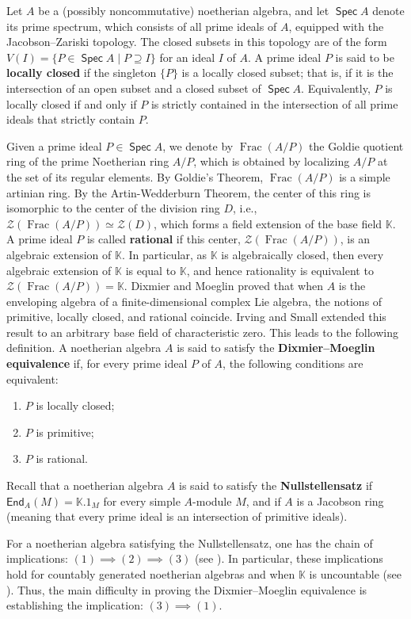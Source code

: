 \documentclass[11pt]{article}
\theoremstyle{definition}
\numberwithin{equation}{section}
\newcommand{\KK}{\mathbb{K}}
\newcommand{\cZ}{\mathcal{Z}}
\newcommand\End{\mathsf{End}}
\DeclareMathOperator{\gfrac}{\mathrm{Frac}}
\DeclareMathOperator{\spec}{\mathsf{Spec}}
\begin{document}
Let $A$ be a (possibly noncommutative) noetherian algebra, and let $\spec A$ denote its prime spectrum, which consists of all prime ideals of $A$,  equipped with the Jacobson--Zariski topology. The closed subsets in this topology are of the form  $V(I) = \{ P \in \spec A \mid P \supseteq I \}$ for an ideal $I$  of $A$. A prime ideal $P$ is said to be \textbf{locally closed} if the singleton $\{P\}$ is a locally closed subset;  that is, if it is the intersection of an open subset and a closed subset of $\spec A$. 
  Equivalently, $P$ is locally closed if and only if $P$ is strictly contained in the intersection of all prime ideals that strictly contain $P$.
  
Given a prime ideal $P \in \spec A$, we denote by $\gfrac(A/P)$ the Goldie quotient ring of the prime Noetherian ring $A/P$, which is obtained by localizing $A/P$ at the set of its regular elements. By Goldie's Theorem, $\gfrac(A/P)$ is a simple artinian ring. By the Artin-Wedderburn Theorem, the center of this ring is isomorphic to the center of the division ring $D$, i.e., $\cZ(\gfrac(A/P)) \simeq \cZ(D)$, which forms a field extension of the base field $\KK$. A prime ideal $P$ is called \textbf{rational} if this center, $\cZ(\gfrac(A/P))$, is an algebraic extension of $\KK$. In particular, as $\KK$ is algebraically closed, then every algebraic extension of $\KK$ is equal to $\KK$, and hence rationality is equivalent to $\cZ(\gfrac(A/P))= \KK$.
  Dixmier \cite{DI77} and Moeglin \cite{Mo80} proved that when $A$ is the enveloping algebra of a finite-dimensional complex Lie algebra, the notions of primitive, locally closed, and rational coincide. 
Irving and Small \cite{IS80} extended this result to an arbitrary base field of characteristic zero. This leads to the following definition. A noetherian algebra $A$ is said to satisfy the \textbf{Dixmier--Moeglin equivalence} if, for every prime ideal $P$ of $A$, the following conditions are equivalent: 
\begin{enumerate}
	\item[(1)] $P$ is locally closed;
	\item[(2)] $P$ is primitive;
	\item[(3)] $P$ is rational. 
\end{enumerate}
Recall that a noetherian algebra $A$ is said to satisfy the \textbf{Nullstellensatz} if  $\End_{A}(M)= \KK.1_{M}$ for every simple $A$-module $M$,  and if $A$ is a Jacobson ring  (meaning that every prime ideal is an intersection of primitive ideals). 

For a noetherian algebra satisfying the Nullstellensatz, one has the chain of implications:  $(1)\implies(2)\implies(3)$ (see \cite[Lemma II.7.15]{BG02}). In particular, these implications hold for countably generated noetherian algebras and when $\KK$ is uncountable (see \cite[II.7.16]{BG02}). Thus, the main difficulty in proving the Dixmier--Moeglin equivalence is establishing the implication: $(3)\implies(1)$. 
\end{document}
